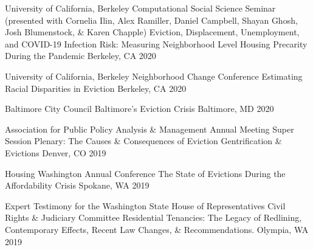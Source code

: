 


\begin{cventries}

  \cventry
    {University of California, Berkeley Computational Social Science Seminar (presented with Cornelia Ilin, Alex Ramiller, Daniel Campbell, Shayan Ghosh, Josh Blumenstock, \& Karen Chapple)} %
    {Eviction, Displacement, Unemployment, and COVID-19 Infection Risk: Measuring Neighborhood Level Housing Precarity During the Pandemic} %
    {Berkeley, CA} %
    {2020} %
    {}

  \cventry
    {University of California, Berkeley Neighborhood Change Conference} %
    {Estimating Racial Disparities in Eviction} %
    {Berkeley, CA} %
    {2020} %
    {}

  \cventry
    {Baltimore City Council} %
    {Baltimore's Eviction Crisis} %
    {Baltimore, MD} %
    {2020} %
    {}

  \cventry
    {Association for Public Policy Analysis \& Management Annual Meeting Super Session Plenary: The Causes \& Consequences of Eviction} %
    {Gentrification \& Evictions} %
    {Denver, CO} %
    {2019} %
    {}

  \cventry
    {Housing Washington Annual Conference} %
    {The State of Evictions During the Affordability Crisis} %
    {Spokane, WA} %
    {2019} %
    {}

  \cventry
    {Expert Testimony for the Washington State House of Representatives Civil Rights \& Judiciary Committee} %
    {Residential Tenancies: The Legacy of Redlining, Contemporary Effects, Recent Law Changes, \& Recommendations.} %
    {Olympia, WA} %
    {2019} %
    {}


\end{cventries}
